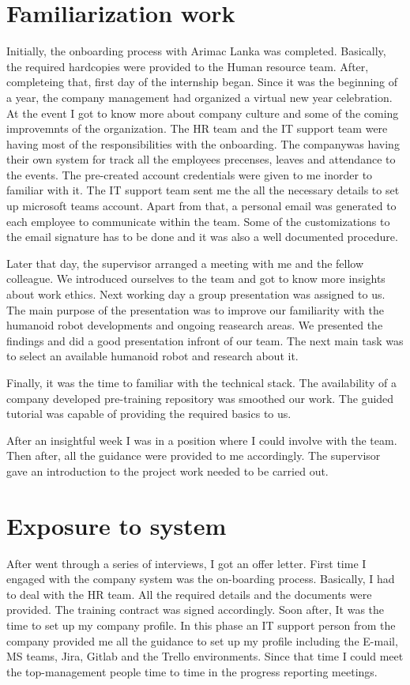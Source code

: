 \documentclass[twoside,12pt,times,onecolumn,a4paper]{report}
\begin{document}
\chapter{Familiarization work}

\hspace{3em} Initially, the onboarding process with Arimac Lanka was completed. Basically, the required hardcopies were provided to the Human resource team. After, completeing that, first day of the internship began. Since it was the beginning of a year, the company management had organized a virtual new year celebration. At the event I got to know more about company culture and some of the coming improvemnts of the organization. The HR team and the IT support team were having most of the responsibilities with the onboarding. The companywas having their own system for track all the employees precenses, leaves and attendance to the events. The pre-created account credentials were given to me inorder to familiar with it. The IT support team sent me the all the necessary details to set up microsoft teams account. Apart from that, a personal email was generated to each employee to communicate within the team. Some of the customizations to the email signature has to be done and it was also a well documented procedure.

Later that day, the supervisor arranged a meeting with me and the fellow colleague. We introduced ourselves to the team and got to know more insights about work ethics. Next working day a group presentation was assigned to us. The main purpose of the presentation was to improve our familiarity with the humanoid robot developments and ongoing reasearch areas. We presented the findings and did a good presentation infront of our team. The next main task was to select an available humanoid robot and research about it. 

Finally, it was the time to familiar with the technical stack. The availability of a company developed pre-training repository was smoothed our work. The guided tutorial was capable of providing the required basics to us. 

After an insightful week I was in a position where I could involve with the team. Then after, all the guidance were provided to me accordingly. The supervisor gave an introduction to the project work needed to be carried out. 


\chapter{Exposure to system}
\hspace{3em} After went through a series of interviews, I got an offer letter. First time I engaged with the company system was the on-boarding process. Basically, I had to deal with the HR team. All the required details and the documents were provided. The training contract was signed accordingly. Soon after, It was the time to set up my company profile. In this phase an IT support person from the company provided me all the guidance to set up my profile including the E-mail, MS teams, Jira, Gitlab and the Trello environments. Since that time I could meet the top-management people time to time in the progress reporting meetings. 
\end{document}
